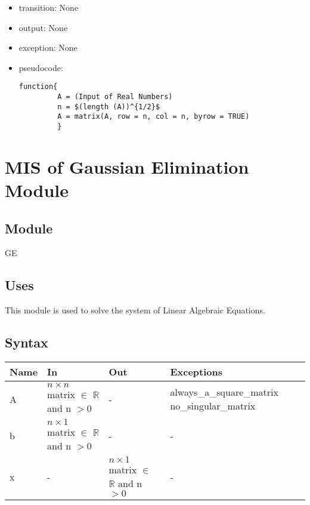 \documentclass[12pt, titlepage]{article}
\begin{document}
\noindent %
\begin{itemize}
\item transition: None%
\item output: None%
\item exception: None%
\item pseudocode:

\begin{lstlisting}
function{
         A = (Input of Real Numbers)
         n = $(length (A))^{1/2}$
         A = matrix(A, row = n, col = n, byrow = TRUE)
         }
\end{lstlisting}

\end{itemize}

\newpage


\section{MIS of {Gaussian Elimination  Module}} \label{modge}

\subsection{Module}

GE


\subsection{Uses}
This module is used to solve the system of Linear Algebraic Equations.


\subsection{Syntax}

\begin{center}
\begin{tabular}{p{2cm} p{4cm} p{4cm} p{2cm}}
\hline
\textbf{Name} & \textbf{In} & \textbf{Out} & \textbf{Exceptions} \\
\hline

A & $n \times n$ matrix $\in$ $\mathbb{R}$ and n $> 0$ & - & always\_a\_square\_matrix no\_singular\_matrix\\
b & $n \times 1$ matrix $\in$ $\mathbb{R}$ and n $> 0$ & - & - \\
x & - & $n \times 1$ matrix $\in$ $\mathbb{R}$ and n $> 0$ & - \\
\hline
\end{tabular}
\end{center}
\end{document}
